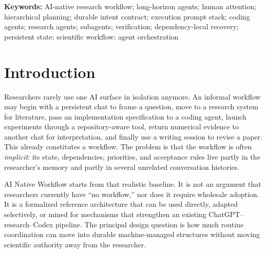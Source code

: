 \documentclass[11pt,a4paper]{article}
\begin{document}
\begin{abstract}
The technical analysis combines a detailed review of current language-model and agent surfaces with a formal treatment of semantic refinement, acceptance predicates, compositional satisfaction, dependency-local invalidation, imperfect verification, context projection, checkpointing, and human oversight. Under complete declared dependencies and version-bound evidence, a repair need invalidate only its dynamic dependency cone, and that cone is worst-case tight. Conversely, evidence aliasing prevents universal verifier correctness. These results adapt established ideas from contracts, incremental computation, runtime verification, and checkpointing; the intended contribution is their integration into an operational language-agent workflow. The report concludes with detailed usage protocols, implementation semantics, evaluation designs, adoption examples, security boundaries, and appendices suitable for maintainers and researchers. Human-attention and long-horizon performance gains remain evaluation targets rather than established comparative results.
\end{abstract}

\noindent\textbf{Keywords:} AI-native research workflow; long-horizon agents; human attention; hierarchical planning; durable intent contract; execution prompt stack; coding agents; research agents; subagents; verification; dependency-local recovery; persistent state; scientific workflow; agent orchestration

\newpage
\setcounter{tocdepth}{2}
\tableofcontents
\newpage

\section{Introduction}\label{sec:introduction}

Researchers rarely use one AI surface in isolation anymore. An informal workflow may begin with a persistent chat to frame a question, move to a research system for literature, pass an implementation specification to a coding agent, launch experiments through a repository-aware tool, return numerical evidence to another chat for interpretation, and finally use a writing session to revise a paper. This already constitutes a workflow. The problem is that the workflow is often \emph{implicit}: its state, dependencies, priorities, and acceptance rules live partly in the researcher's memory and partly in several unrelated conversation histories.

AI Native Workflow starts from that realistic baseline. It is not an argument that researchers currently have ``no workflow,'' nor does it require wholesale adoption. It is a formalized reference architecture that can be used directly, adapted selectively, or mined for mechanisms that strengthen an existing ChatGPT--research--Codex pipeline. The principal design question is how much routine coordination can move into durable machine-managed structures without moving scientific authority away from the researcher.
\end{document}
